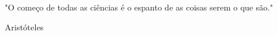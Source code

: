 \null %
\vfill
\epigraph{"O começo de todas as ciências é o espanto de as coisas serem o que são."}{Aristóteles}
